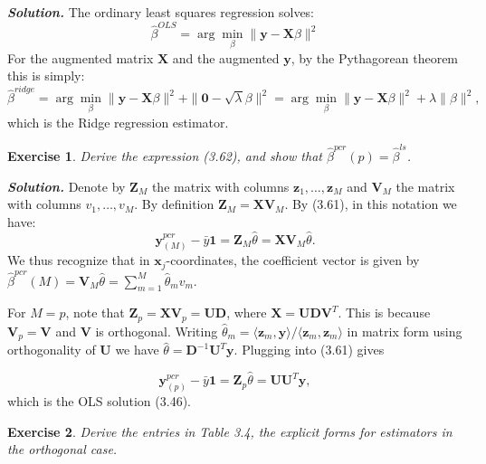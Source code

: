 \documentclass[12pt]{article}
\def\b1{\textbf{1}}
\def\bx{\textbf{x}}
\def\bz{\textbf{z}}
\def\bX{\textbf{X}}
\def\by{\textbf{y}}
\def\bV{\textbf{V}}
\def\bU{\textbf{U}}
\def\bD{\textbf{D}}
\def\bV{\textbf{V}}
\def\bZ{\textbf{Z}}
\newtheorem{exercise}{Exercise}[section]
\newenvironment{solution}[1][\it{Solution}]{\textbf{#1. } }{\vspace{.5cm}}
\begin{document}
\begin{solution}
    The ordinary least squares regression solves:
    $$\hat{\beta}^{OLS} = \arg\min_{\beta} \|\by - \bX \beta\|^2$$
    For the augmented matrix $\bX$ and the augmented $\by$, by the Pythagorean theorem this is simply:
    $$\hat{\beta}^{ridge} = \arg\min_{\beta} \|\by - \bX \beta\|^2 + \|\mathbf{0} -\sqrt{\lambda} \beta\|^2 = \arg\min_{\beta} \|\by - \bX \beta\|^2 + \lambda \|\beta\|^2,$$
    which is the Ridge regression estimator.

\end{solution}


\begin{exercise}
Derive the expression (3.62), and show that $\hat{\beta}^{pcr}(p) = \hat{\beta}^{ls}$.	
\end{exercise}

\begin{solution}
Denote by $\bZ_M$ the matrix with columns $\bz_1, \dots, \bz_M$ and $\bV_M$ the matrix with columns $v_1, \dots, v_M$. By definition $\bZ_M = \bX \bV_M$. By (3.61), in this notation we have: 
$$\by_{(M)}^{pcr} - \bar{y} \b1 = \bZ_M \hat{\theta} = \bX \bV_M \hat{\theta}.$$
We thus recognize that in $\bx_j$-coordinates, the coefficient vector is given by $\hat{\beta}^{pcr}(M) = \bV_M \hat{\theta} = \sum_{m=1}^M \hat{\theta}_m v_m$. 

For $M = p$, note that $\bZ_p = \bX \bV_p = \bU \bD$, where $\bX = \bU \bD \bV^T$. This is because $\bV_p = \bV$ and $\bV$ is orthogonal. Writing $\hat{\theta}_m = \langle \bz_m, \by \rangle /\langle \bz_m, \bz_m \rangle$ in matrix form using orthogonality of $\bU$ we have $\hat{\theta} = \bD^{-1} \bU^T \by$. Plugging into (3.61) gives

$$\by_{(p)}^{pcr} - \bar{y} \b1 = \bZ_p \hat{\theta} = \bU \bU^T \by,$$
which is the OLS solution (3.46).
\end{solution}




\begin{exercise}
Derive the entries in Table 3.4, the explicit forms for estimators in the orthogonal case.	
\end{exercise}
\end{document}
